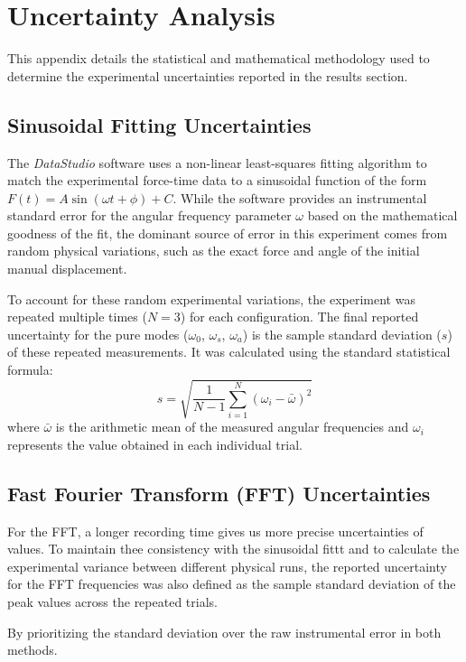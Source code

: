 \documentclass[a4paper,11pt]{article}
\begin{document}
\appendix
\section{Uncertainty Analysis}
This appendix details the statistical and mathematical methodology used to determine the experimental uncertainties reported in the results section.

\subsection{Sinusoidal Fitting Uncertainties}
The \textit{DataStudio} software uses a non-linear least-squares fitting algorithm to match the experimental force-time data to a sinusoidal function of the form $F(t) = A \sin(\omega t + \phi) + C$. While the software provides an instrumental standard error for the angular frequency parameter $\omega$ based on the mathematical goodness of the fit, the dominant source of error in this experiment comes from random physical variations, such as the exact force and angle of the initial manual displacement.

To account for these random experimental variations, the experiment was repeated multiple times ($N=3$) for each configuration. The final reported uncertainty for the pure modes ($\omega_0$, $\omega_s$, $\omega_a$) is the sample standard deviation ($s$) of these repeated measurements. It was calculated using the standard statistical formula:
\begin{equation}
s = \sqrt{\frac{1}{N-1} \sum_{i=1}^{N} (\omega_i - \bar{\omega})^2}
\end{equation}
where $\bar{\omega}$ is the arithmetic mean of the measured angular frequencies and $\omega_i$ represents the value obtained in each individual trial.

\subsection{Fast Fourier Transform (FFT) Uncertainties}
For the FFT, a longer recording time gives us more precise uncertainties of values. To maintain thee consistency with the sinusoidal fittt and to calculate the experimental variance between different physical runs, the reported uncertainty for the FFT frequencies was also defined as the sample standard deviation of the peak values across the repeated trials. 

By prioritizing the standard deviation over the raw instrumental error in both methods.



\end{document}
